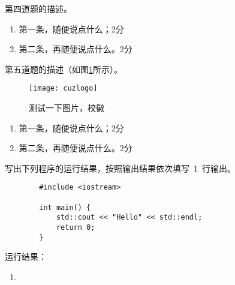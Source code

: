 \documentclass[answer,sheet]{cuzexam} %
\begin{document}
\begin{problem}
    第四道题的描述。
\end{problem}

\begin{solution}
    \begin{enumerate}[label=(\arabic*)]
        \item 第一条，随便说点什么；\dotfill 2分
        \item 第二条，再随便说点什么。\dotfill 2分
    \end{enumerate}
\end{solution}

\begin{studentanswer}
    \vspace{28ex}
\end{studentanswer}

\begin{problem}
    第五道题的描述（如图\ref{fig:1}所示）。
    \begin{figure}[h]
        \centering
        \texttt{[image: cuzlogo]}
        \caption[校徽]{测试一下图片，校徽}
        \label{fig:1}
    \end{figure}
\end{problem}

\begin{solution}
    \begin{enumerate}[label=(\arabic*)]
        \item 第一条，随便说点什么；\dotfill 2分
        \item 第二条，再随便说点什么。\dotfill 2分
    \end{enumerate}
\end{solution}

\begin{studentanswer}
    \vspace{28ex}
\end{studentanswer}


\begin{problem}
    写出下列程序的运行结果，按照输出结果依次填写~1~行输出。
    \begin{verbatim}
        #include <iostream>
        
        int main() {
            std::cout << "Hello" << std::endl;
            return 0;
        }
    \end{verbatim}
    运行结果：
    \begin{enumerate}[label=(\arabic*),series=cuzafter]
        \item {}
    \end{enumerate}
\end{problem}
\end{document}
